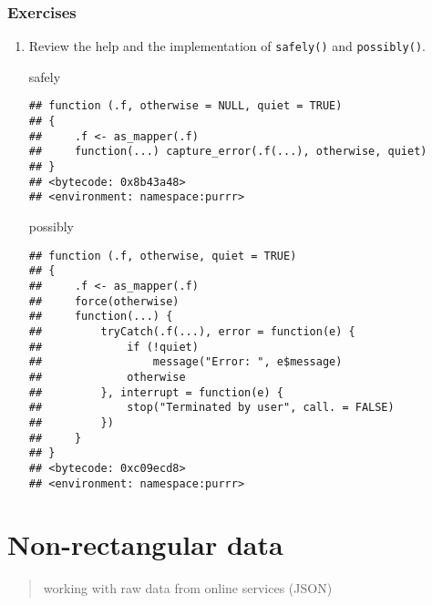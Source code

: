 \documentclass[]{book}
\newenvironment{Shaded}{\begin{snugshade}}{\end{snugshade}}
\newcommand{\NormalTok}[1]{#1}
\begin{document}
\hypertarget{exercises-19}{%
\subsection{Exercises}\label{exercises-19}}

\begin{enumerate}
\def\labelenumi{\arabic{enumi}.}
\item
  Review the help and the implementation of \texttt{safely()} and \texttt{possibly()}.

\begin{Shaded}
\begin{Highlighting}[]
\NormalTok{safely}
\end{Highlighting}
\end{Shaded}

\begin{verbatim}
## function (.f, otherwise = NULL, quiet = TRUE) 
## {
##     .f <- as_mapper(.f)
##     function(...) capture_error(.f(...), otherwise, quiet)
## }
## <bytecode: 0x8b43a48>
## <environment: namespace:purrr>
\end{verbatim}

\begin{Shaded}
\begin{Highlighting}[]
\NormalTok{possibly}
\end{Highlighting}
\end{Shaded}

\begin{verbatim}
## function (.f, otherwise, quiet = TRUE) 
## {
##     .f <- as_mapper(.f)
##     force(otherwise)
##     function(...) {
##         tryCatch(.f(...), error = function(e) {
##             if (!quiet) 
##                 message("Error: ", e$message)
##             otherwise
##         }, interrupt = function(e) {
##             stop("Terminated by user", call. = FALSE)
##         })
##     }
## }
## <bytecode: 0xc09ecd8>
## <environment: namespace:purrr>
\end{verbatim}
\end{enumerate}

\hypertarget{non-rectangular-data}{%
\chapter{Non-rectangular data}\label{non-rectangular-data}}

\begin{quote}
working with raw data from online services (JSON)
\end{quote}
\end{document}
